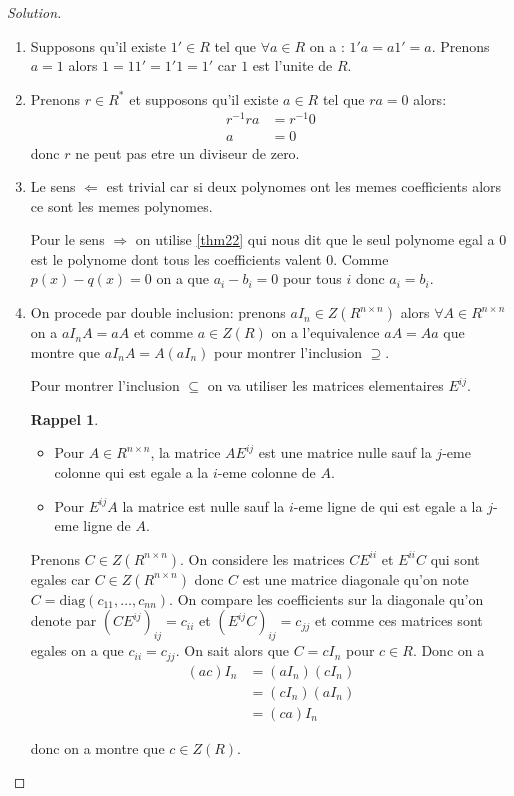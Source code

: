 \documentclass[a4paper,11pt,french]{report}
\theoremstyle{plain}
\theoremstyle{definition}
\newtheorem*{reminder}{Rappel}
\begin{document}
\begin{proof}[Solution]
\begin{enumerate}
\item Supposons qu'il existe $1'\in R$ tel que $\forall a\in R$ on a : $1'a=a1'=a$. Prenons $a=1$ alors $1=11'=1'1=1'$ car $1$ est l'unite de $R$.
\item Prenons $r\in R^{*}$ et supposons qu'il existe $a\in R$ tel que $ra=0$ alors:
\begin{align*}
r^{-1}ra & =r^{-1}0 \\
a & =0
\end{align*}
donc $r$ ne peut pas etre un diviseur de zero.
\item Le sens $\Leftarrow$ est trivial car si deux polynomes ont les memes coefficients alors ce sont les memes polynomes.

Pour le sens $\Rightarrow$ on utilise \ref{thm22} qui nous dit que le seul polynome egal a 0 est le polynome dont tous les coefficients valent 0. Comme $p(x)-q(x)=0$ on a que $a_{i}-b_{i}=0$ pour tous $i$ donc $a_{i}=b_{i}$.
\item On procede par double inclusion: prenons $aI_{n}\in Z(R^{n\times n})$ alors $\forall A\in R^{n\times n}$ on a $aI_{n}A=aA$ et comme $a\in Z(R)$ on a l'equivalence $aA=Aa$ que montre que $aI_{n}A=A(aI_{n})$ pour montrer l'inclusion $\supseteq$.

Pour montrer l'inclusion $\subseteq$ on va utiliser les matrices elementaires $E^{ij}$. 
\begin{reminder}
\begin{itemize}
\item Pour $A\in R^{n\times n}$, la matrice $AE^{ij}$ est une matrice nulle sauf la $j$-eme colonne qui est egale a la $i$-eme colonne de $A$.
\item Pour $E^{ij}A$ la matrice est nulle sauf la $i$-eme ligne de qui est egale a la $j$-eme ligne de $A$.
\end{itemize}
\end{reminder}
Prenons $C\in Z(R^{n\times n})$. On considere les matrices $CE^{ii}$ et $E^{ii}C$ qui sont egales car $C\in Z(R^{n\times n})$ donc $C$ est une matrice diagonale qu'on note $C=\mathrm{diag}(c_{11},\dots,c_{nn})$. On compare les coefficients sur la diagonale qu'on denote par $(CE^{ij})_{ij}=c_{ii}$ et $(E^{ij}C)_{ij}=c_{jj}$ et comme ces matrices sont egales on a que $c_{ii}=c_{jj}$. On sait alors que $C=cI_{n}$ pour $c\in R$. Donc on a
\begin{align*}
(ac)I_{n} & =(aI_{n})(cI_{n}) \\
 & =(cI_{n})(aI_{n}) \\
 & =(ca)I_{n} 
\end{align*}

donc on a montre que $c\in Z(R)$.
\end{enumerate}
\end{proof}
\end{document}
